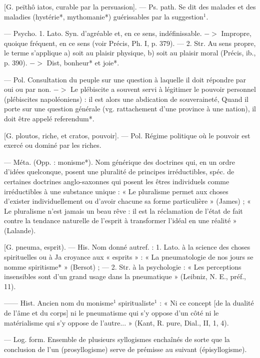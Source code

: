 \begin{itemize}[leftmargin=1cm, label=, itemsep=1pt]
 [G. peïthô iatos, curable
par la persuasion]. — Ps. path. Se
dit des malades et des maladies
(hystérie*, mythomanie*) guérissables par la suggestion$^1$.

 — Psycho. 1. Lato. Syn.
d’agréable et, en ce sens, indéfinissable. $->$ Impropre, quoique fréquent, en ce sens (voir Précis, Ph. I,
p. 379). — 2. Str. Au sens propre,
le terme s'applique a) soit au
plaisir physique, b) soit au plaisir
moral (Précis, ib., p. 390). $->$ Dist,
bonheur* et joie*.

 — Pol. Consultation du
peuple sur une question à laquelle
il doit répondre par oui ou par non.
$->$ Le plébiscite a souvent servi à
légitimer le pouvoir personnel (plébiscites napoléoniens) : il est alors
une abdication de souveraineté,
Quand il porte sur une question
générale (vg. rattachement d'une
province à une nation), il doit être
appelé referendum*.

 [G. ploutos, riche, et
cratos, pouvoir]. — Pol. Régime politique où le pouvoir est exercé ou
dominé par les riches.

 — Méta. (Opp. : monisme*).
Nom générique des doctrines qui,
en un ordre d’idées quelconque,
posent une pluralité de principes
irréductibles, spéc. de certaines doctrines anglo-saxonnes qui posent
les êtres individuels comme irréductibles à une substance unique :
« Le pluralisme permet aux choses
d’exister individuellement ou d’avoir
chacune sa forme particulière »
(James) ; « Le pluralisme n'est
jamais un beau rêve : il est la réclamation de l’état de fait contre la
tendance naturelle de l'esprit à
transformer l'idéal en une réalité »
(Lalande).

 [G.
pneuma, esprit). — His. Nom
donné autref. : 1. Lato. à la science
des choses spirituelles ou à Ja
croyance aux « esprits » : « La pneumatologie
de nos jours se nomme
spiritisme* » (Bersot) ; — 2. Str. à
la psychologie : « Les perceptions
insensibles sont d’un grand usage
dans la pneumatique » (Leibniz,
N. E., préf., 11).

 —— Hist. Ancien nom
du monisme$^1$ spiritualiste$^1$ : « Ni ce
concept [de la dualité de l'âme et
du corps] ni le pneumatisme qui s’y
oppose d’un côté ni le matérialisme
qui s’y oppose de l’autre... » (Kant,
R. pure, Dial., II, 1, 4).

 — Log. form. Ensemble de plusieurs syllogismes
enchaînés de sorte que la conclusion de l’un (prosyllogisme) serve
de prémisse au suivant (épisyllogisme).


\end{itemize}
